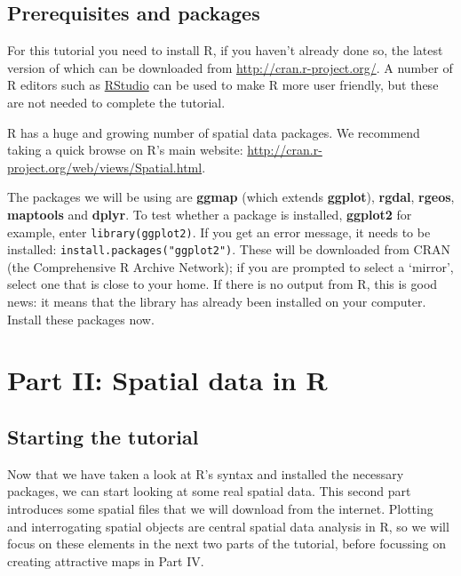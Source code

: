 \documentclass[]{article}
\begin{document}
\subsection{Prerequisites and
packages}\label{prerequisites-and-packages}

For this tutorial you need to install R, if you haven't already done so,
the latest version of which can be downloaded from
\href{http://cran.r-project.org/}{\url{http://cran.r-project.org/}}. A
number of R editors such as \href{http://www.rstudio.com/}{RStudio} can
be used to make R more user friendly, but these are not needed to
complete the tutorial.

R has a huge and growing number of spatial data packages. We recommend
taking a quick browse on R's main website:
\href{http://cran.r-project.org/web/views/Spatial.html}{\url{http://cran.r-project.org/web/views/Spatial.html}}.

The packages we will be using are \textbf{ggmap} (which extends
\textbf{ggplot}), \textbf{rgdal}, \textbf{rgeos}, \textbf{maptools} and
\textbf{dplyr}. To test whether a package is installed, \textbf{ggplot2}
for example, enter \texttt{library(ggplot2)}. If you get an error
message, it needs to be installed: \texttt{install.packages("ggplot2")}.
These will be downloaded from CRAN (the Comprehensive R Archive
Network); if you are prompted to select a `mirror', select one that is
close to your home. If there is no output from R, this is good news: it
means that the library has already been installed on your computer.
Install these packages now.

\section{Part II: Spatial data in R}\label{part-ii-spatial-data-in-r}

\subsection{Starting the tutorial}\label{starting-the-tutorial}

Now that we have taken a look at R's syntax and installed the necessary
packages, we can start looking at some real spatial data. This second
part introduces some spatial files that we will download from the
internet. Plotting and interrogating spatial objects are central spatial
data analysis in R, so we will focus on these elements in the next two
parts of the tutorial, before focussing on creating attractive maps in
Part IV.
\end{document}
